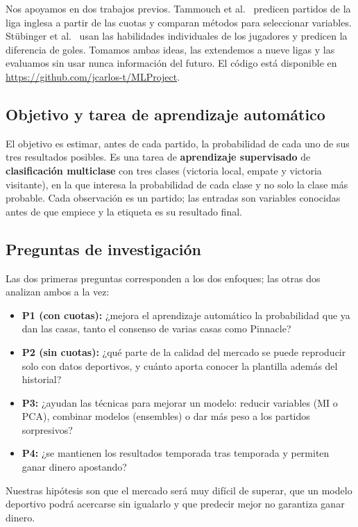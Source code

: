 \documentclass[conference]{IEEEtran}
\begin{document}
Nos apoyamos en dos trabajos previos. Tammouch et al.~\cite{tammouch2024} predicen partidos de la liga inglesa a partir de las cuotas y comparan métodos para seleccionar variables. Stübinger et al.~\cite{stubinger2020} usan las habilidades individuales de los jugadores y predicen la diferencia de goles. Tomamos ambas ideas, las extendemos a nueve ligas y las evaluamos sin usar nunca información del futuro. El código está disponible en \url{https://github.com/jcarlos-t/MLProject}.

\subsection{Objetivo y tarea de aprendizaje automático}
El objetivo es estimar, antes de cada partido, la probabilidad de cada uno de sus tres resultados posibles. Es una tarea de \textbf{aprendizaje supervisado} de \textbf{clasificación multiclase} con tres clases (victoria local, empate y victoria visitante), en la que interesa la probabilidad de cada clase y no solo la clase más probable. Cada observación es un partido; las entradas son variables conocidas antes de que empiece y la etiqueta es su resultado final.

\subsection{Preguntas de investigación}
Las dos primeras preguntas corresponden a los dos enfoques; las otras dos analizan ambos a la vez:
\begin{itemize}
\item \textbf{P1 (con cuotas):} ¿mejora el aprendizaje automático la probabilidad que ya dan las casas, tanto el consenso de varias casas como Pinnacle?
\item \textbf{P2 (sin cuotas):} ¿qué parte de la calidad del mercado se puede reproducir solo con datos deportivos, y cuánto aporta conocer la plantilla además del historial?
\item \textbf{P3:} ¿ayudan las técnicas para mejorar un modelo: reducir variables (MI o PCA), combinar modelos (ensembles) o dar más peso a los partidos sorpresivos?
\item \textbf{P4:} ¿se mantienen los resultados temporada tras temporada y permiten ganar dinero apostando?
\end{itemize}
Nuestras hipótesis son que el mercado será muy difícil de superar, que un modelo deportivo podrá acercarse sin igualarlo y que predecir mejor no garantiza ganar dinero.
\end{document}
